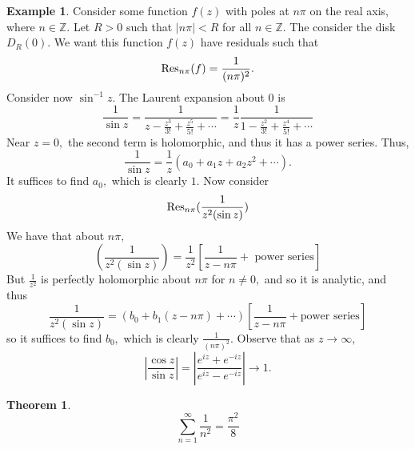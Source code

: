 \documentclass[10pt, oneside]{article}
\newcommand{\bbZ}{\mathbb{Z}}
\theoremstyle{definition}
\newtheorem{exmp}{Example}[section]
\newtheorem{thm}{Theorem}
\begin{document}
\begin{exmp}
    Consider some function $f(z)$ with poles at $n\pi$ on the real axis, where $n \in \bbZ.$ Let $R>0$ such that $|n \pi |< R$ for all $n \in \bbZ.$ The consider the disk $D_R(0).$ We want this function $f(z)$ have residuals such that 
    \[\Res_{n\pi}(f) = \frac{1}{(n\pi )^2}.\] Consider now $\sin^{-1} z.$ The Laurent expansion about $0$ is 
    \[\frac{1}{\sin z} = \frac{1}{z - \frac{z^3}{3!} + \frac{z^5}{5!} + \cdots } = \frac{1}{z}\frac{1}{1 - \frac{z^2}{3!} + \frac{z^4}{5!} + \cdots}\] Near $z = 0,$ the second term is holomorphic, and thus it has a power series. Thus, 
    \[\frac{1}{\sin z} = \frac{1}{z} (a_0 + a_1z + a_2z^2 + \cdots).\] It suffices to find $a_0,$ which is clearly $1.$ Now consider 
    \[\Res_{n \pi} (\frac{1}{z^2(\sin z)})\] We have that about $n\pi,$
    \[(\frac{1}{z^2(\sin z)})=\frac{1}{z^2}\left[ \frac{1}{z - n\pi} + \text{ power series}\right]\] But $\frac{1}{z^2}$ is perfectly holomorphic about $n\pi$ for $n \neq0,$ and so it is analytic, and thus 
    \[\frac{1}{z^2(\sin z)} = (b_0 + b_1(z- n\pi)+ \cdots)\left[\frac{1}{z - n\pi} + \text {power series}\right]\] so it suffices to find $b_0,$ which is clearly $\frac{1}{(n\pi)^2}.$ Observe that as $z\to \infty,$
    \[\left|\frac{\cos z}{\sin z}\right| = \left|\frac{e^{iz}+ e^{-iz}}{e^{iz} - e^{-iz}}\right|\to 1.\] 
\end{exmp}
\begin{thm}
    \[\sum_{n=1}^\infty \frac{1}{n^2} = \frac{\pi^2}{8}\]
\end{thm}
\end{document}
